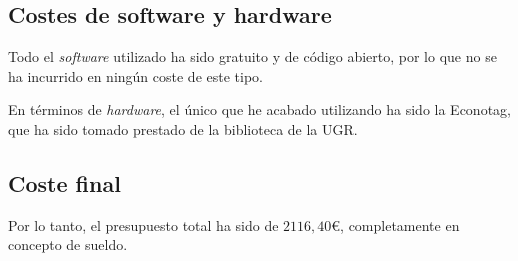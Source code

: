 \subsection{Costes de software y hardware}
Todo el \emph{software} utilizado ha sido gratuito y de código abierto, por lo que no se ha incurrido en ningún coste de este tipo.

En términos de \emph{hardware}, el único que he acabado utilizando ha sido la Econotag, que ha sido tomado prestado de la biblioteca de la UGR.


\subsection{Coste final}
Por lo tanto, el presupuesto total ha sido de $2116,40$€, completamente en concepto de sueldo.

%
